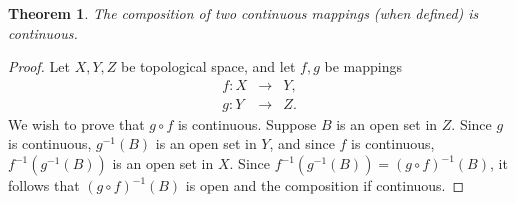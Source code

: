 \documentclass[12pt]{article}
\newtheorem{thm}{Theorem}
\begin{document}
\begin{thm} The composition of two continuous mappings (when 
defined) is continuous.
\end{thm}

\begin{proof} Let $X,Y,Z$ be topological space, and let $f,g$ be
mappings
\begin{eqnarray*}
   f\colon X&\to& Y, \\
   g\colon Y&\to& Z.
\end{eqnarray*}
We wish to prove that $g\circ f$ is continuous. Suppose $B$ is 
an open set in $Z$. 
  Since $g$ is continuous, $g^{-1}(B)$ is an open set in $Y$,
and
  since $f$ is continuous, $f^{-1}(g^{-1}(B))$ is an open set in $X$.
Since $f^{-1}(g^{-1}(B))=(g\circ f)^{-1}(B)$, it follows 
   that $(g\circ f)^{-1}(B)$ is open and the composition if continuous.
\end{proof}
\end{document}

